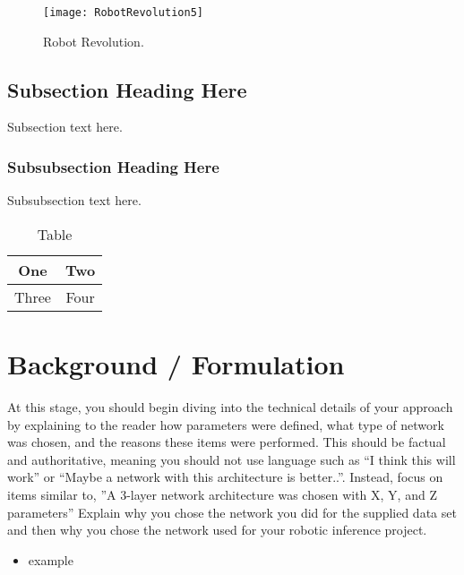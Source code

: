 \documentclass[10pt,journal,compsoc]{IEEEtran}
\begin{document}
	\begin{figure}[thpb]
		\centering
		\texttt{[image: RobotRevolution5]}
		\caption{Robot Revolution.}
		\label{fig:robot1}
	\end{figure}
	
	\subsection{Subsection Heading Here}
	Subsection text here.
	
	\subsubsection{Subsubsection Heading Here}
	Subsubsection text here.
	
	
	\begin{table}[h]
		\caption{Table}
		\label{table_example}
		\begin{center}
			\begin{tabular}{|c||c|}
				\hline
				One & Two\\
				\hline
				Three & Four\\
				\hline
			\end{tabular}
		\end{center}
	\end{table}
	
	
	
	
	
	\section{Background / Formulation}
	At this stage, you should begin diving into the technical details of your approach by explaining to the reader how parameters were defined, what type of network was chosen, and the reasons these items were performed. This should be factual and authoritative, meaning you should not use language such as “I think this will work” or “Maybe a network with this architecture is better..”. Instead, focus on items similar to, ”A 3-layer network architecture was chosen with X, Y, and Z parameters” 
	Explain why you chose the network you did for the supplied data set and then why you chose the network used for your robotic inference project. \cite{lamport1994latex}
	
	
	\begin{itemize}
		\item example
		\end {itemize}
		
\end{document}
